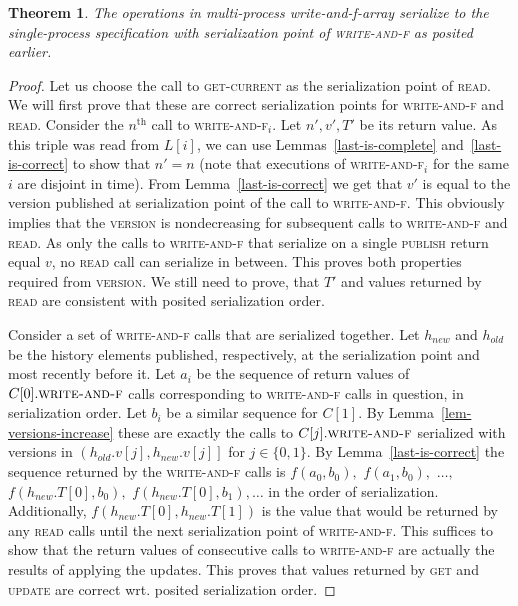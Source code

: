 \documentclass[a4paper,11pt]{article}
\newtheorem{theorem}{Theorem}
\newcommand{\fn}[1]{\textsc{#1}}
\begin{document}
\begin{theorem}
	The operations in multi-process write-and-f-array serialize to the single-process specification with serialization point of \fn{write-and-f} as posited earlier.
\end{theorem}
\begin{proof}
	Let us choose the call to \fn{get-current} as the serialization point of \fn{read}. 
	We will first prove that these are correct serialization points for \fn{write-and-f} and \fn{read}.
	Consider the $n^{\text{th}}$ call to \fn{write-and-f$_i$}. Let $n', v', T'$ be its return value. As this triple was read from $L[i]$, we can use Lemmas~\ref{last-is-complete} and~\ref{last-is-correct} to show that
	$n' = n$ (note that executions of \fn{write-and-f$_i$} for the same $i$ are disjoint in time). From Lemma~\ref{last-is-correct} we get that $v'$ is equal to the
	version published at serialization point of the call to \fn{write-and-f}. This obviously implies that the \fn{version} is nondecreasing for subsequent calls to \fn{write-and-f} and \fn{read}.
	As only the calls to \fn{write-and-f} that serialize on a single \fn{publish} return equal $v$, no \fn{read} call can serialize in between. This proves both properties required from \fn{version}. We still need to prove,
	that $T'$ and values returned by \fn{read} are consistent with posited serialization order.
	
	Consider a set of \fn{write-and-f} calls that are serialized together. Let $h_{new}$ and $h_{old}$ be the history elements published, respectively, at the serialization point and most recently before it. Let $a_i$ be the sequence of return values
	of $C[0].\fn{write-and-f}$ calls corresponding to \fn{write-and-f} calls in question, in serialization order. Let $b_i$ be a similar sequence for $C[1]$. By Lemma~\ref{lem-versions-increase} these are exactly the calls to
	$C[j].\fn{write-and-f}$ serialized with versions in $\left(h_{old}.v[j], h_{new}.v[j]\right]$ for $j \in \{0, 1\}$. By Lemma~\ref{last-is-correct} the sequence returned
by the \fn{write-and-f} calls is $f(a_0, b_0), $ $f(a_1, b_0),$ $\ldots, $ $f(h_{new}.T[0], b_0), $ $f(h_{new}.T[0], b_1), \ldots$ in the order of serialization. 
Additionally, $f(h_{new}.T[0], h_{new}.T[1])$ is the value that would be returned by any \fn{read} calls until the next serialization point of \fn{write-and-f}.
This suffices to show that the return values of consecutive calls to \fn{write-and-f} are actually the results of applying the updates.
This proves that values returned by \fn{get} and \fn{update} are correct wrt. posited serialization order.
	

\end{proof}
\end{document}
